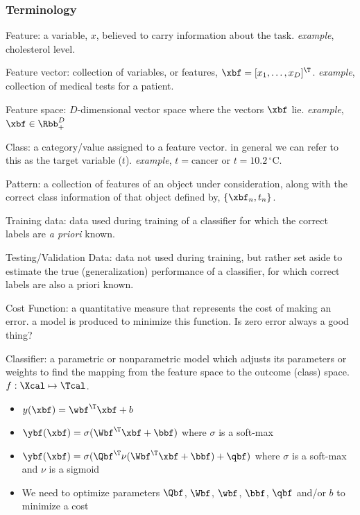 \documentclass[aspectratio=169,xcolor=dvipsnames,svgnames,x11names,fleqn]{beamer}
\begin{document}
 \begin{frame}
   \frametitle{\bf Terminology}
   \begin{itemize}
  {    \item {\color{MediumBlue}Feature}: a variable, $x$, believed to carry information about the task. {\em example}, cholesterol level.}

  {    \item {\color{MediumBlue}Feature vector}: collection of variables, or features, $\xbf = [x_1,\ldots,x_D]^\T$. {\em example}, collection of medical tests for a patient.}

   {   \item {\color{MediumBlue}Feature space}: $D$-dimensional vector space where the vectors $\xbf$ lie. {\em example}, $\xbf \in \Rbb_+^D$}
 
   {   \item {\color{MediumBlue}Class}: a category/value assigned to a feature vector. in general we can refer to this as the target variable ($t$). {\em example}, $t = \textrm{cancer}$ or $t = 10.2\,^{\circ}\mathrm{C}$.}
 
  {    \item {\color{MediumBlue}Pattern}: a collection of features of an object under consideration, along with the correct class information of that object defined by, $\{\xbf_n,t_n\}$.}

   {   \item {\color{MediumBlue}Training data}: data used during training of a classifier for which the correct labels are {\em a priori} known.}
 
   {   \item {\color{MediumBlue}Testing/Validation Data}: data not used during training, but rather set aside to estimate the true  (generalization) performance of a classifier, for which correct labels are also a priori known.}
 
   {   \item {\color{MediumBlue}Cost Function}: a quantitative measure that represents the cost of making an error. a model is produced to minimize this function. Is zero error always a good thing?}
 
   {   \item {\color{MediumBlue}Classifier}: a parametric or nonparametric model which adjusts its parameters or weights to find the mapping from the feature space to the outcome (class) space. $f: \Xcal \mapsto \Tcal$. 
       \begin{itemize}
         \item $y(\xbf) = \wbf^\T\xbf + b$
         \item $\ybf(\xbf) = \sigma(\Wbf^\T \xbf + \bbf)$ where $\sigma$ is a soft-max
         \item $\ybf(\xbf) = \sigma( \Qbf^\T\nu(\Wbf^\T \xbf + \bbf) +\qbf )$ where $\sigma$ is a soft-max and $\nu$ is a sigmoid
         \item We need to optimize parameters $\Qbf$, $\Wbf$, $\wbf$, $\bbf$, $\qbf$ and/or $b$ to minimize a cost 
       \end{itemize}}
      

\end{itemize}
\end{frame}
\end{document}
